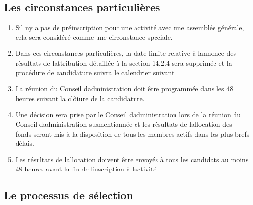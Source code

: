\subsection{Les circonstances particulières}
\label{les-circonstances-particulieres}

\begin{enumerate}
 \item
  S\textquotesingle il n\textquotesingle y a pas de préinscription pour une activité avec une assemblée générale, cela sera considéré comme une circonstance spéciale.
 \item
  Dans ces circonstances particulières, la date limite relative à l\textquotesingle annonce des résultats de l\textquotesingle attribution détaillée à la section 14.2.4 sera supprimée et la procédure de candidature suivra le calendrier suivant.
 \item
  La réunion du Conseil d\textquotesingle administration doit être programmée dans les 48 heures suivant la clôture de la candidature.
 \item
  Une décision sera prise par le Conseil d\textquotesingle administration lors de la réunion du Conseil d\textquotesingle administration susmentionnée et les résultats de l\textquotesingle allocation des fonds seront mis à la disposition de tous les membres actifs dans les plus brefs délais.
 \item
  Les résultats de l\textquotesingle allocation doivent être envoyés à tous les candidats au moins 48 heures avant la fin de l\textquotesingle inscription à l\textquotesingle activité.
\end{enumerate}

\subsection{Le processus de sélection}
\label{le-processus-de-selection}


